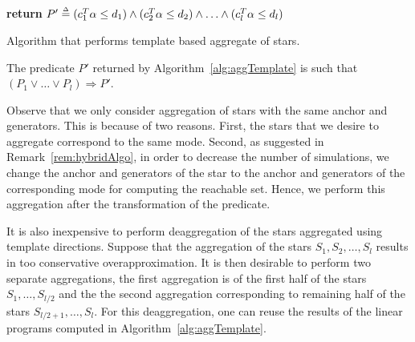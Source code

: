 \begin{algorithm}[h!]
\SetAlgoVlined
{}

{\bf return} $P' \mathrel{\stackrel{\scriptscriptstyle\Delta}{=}} (c_1^T \alpha \leq d_1) \wedge (c_2^T \alpha \leq d_2) \wedge \ldots \wedge (c_l^{T} \alpha \leq d_l)$\;
\caption{Algorithm that performs template based aggregate of stars.}
\label{alg:aggTemplate}
\end{algorithm}

\begin{lemma}
The predicate $P'$ returned by Algorithm~\ref{alg:aggTemplate} is such that $(P_1 \vee \ldots \vee P_l) \Rightarrow P'$.
\end{lemma}


%
%
Observe that we only consider aggregation of stars with the same anchor and generators. This is because of two reasons. First, the stars that we desire to aggregate correspond to the same mode. Second, as suggested in Remark~\ref{rem:hybridAlgo}, in order to decrease the number of simulations, we change the anchor and generators of the star to the anchor and generators of the corresponding mode for computing the reachable set. Hence, we perform this aggregation after the transformation of the predicate.

It is also inexpensive to perform deaggregation of the stars aggregated using template directions. 
%
Suppose that the aggregation of the stars $S_1, S_2, \ldots, S_l$ results in too conservative overapproximation. 
%
It is then desirable to perform two separate aggregations, the first aggregation is of the first half of the stars $S_1, \ldots, S_{l/2}$ and the the second aggregation corresponding to remaining half of the stars $S_{l/2+1}, \ldots, S_{l}$. 
%
For this deaggregation, one can reuse the results of the linear programs computed in Algorithm~\ref{alg:aggTemplate}.

